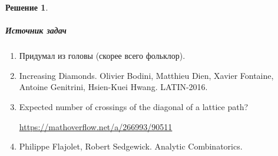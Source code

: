\documentclass[a5paper]{article}
\theoremstyle{definition}
\newtheorem*{solution}{Решение}
\begin{document}
\begin{solution}

\end{solution}

\subparagraph*{Источник задач}
\begin{enumerate}
\item Придумал из головы (скорее всего фольклор).
\item Increasing Diamonds. Olivier Bodini, Matthieu Dien, Xavier Fontaine,
Antoine Genitrini, Hsien-Kuei Hwang. LATIN-2016.
\item Expected number of crossings of the diagonal of a lattice path? 

\url{https://mathoverflow.net/a/266993/90511}
\item Philippe Flajolet, Robert Sedgewick. Analytic Combinatorics.
\end{enumerate}
\end{document}
